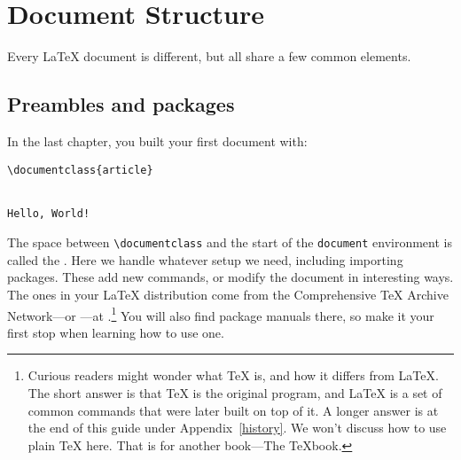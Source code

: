 \chapter{Document Structure}
\label{structure}

Every \LaTeX{} document is different,
but all share a few common elements.

\section{Preambles and packages}
In the last chapter, you built your first document with:
\begin{leftfigure}
\begin{lstlisting}
\documentclass{article}


Hello, World!

\end{lstlisting}
\end{leftfigure}
The space between \verb|\documentclass| and the start of the
\texttt{document} environment is called the .
Here we handle whatever setup we need, including importing packages.
These add new commands, or modify the document in interesting ways.
The ones in your \LaTeX{} distribution come from the Comprehensive \TeX{}
Archive Network---or ---at .\punckern\footnote{%
Curious readers might wonder what \TeX{} is, and how it differs from \LaTeX.
The short answer is that \TeX{} is the original program, and \LaTeX{}
is a set of common commands that were later built on top of it.
A longer answer is at the end of this guide under Appendix~\ref{history}.
We won't discuss how to use plain \TeX{} here. That is for another book---The
\TeX book.}
You will also find package manuals there,
so make it your first stop when learning how to use one.

